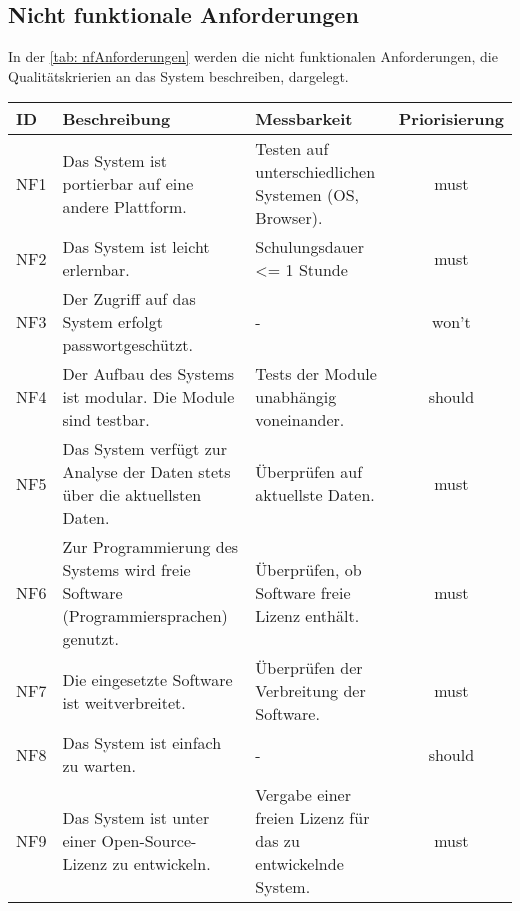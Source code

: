 \subsection{Nicht funktionale Anforderungen}
In der \autoref{tab: nfAnforderungen} werden die nicht funktionalen Anforderungen, die Qualitätskrierien an das System
beschreiben, dargelegt.
\begingroup
\setlength{\tabcolsep}{9pt} %
\renewcommand{\arraystretch}{1.0} 
\begin{table}[H]
    \centering
    \begin{adjustbox}{max width=\textwidth}
    \begin{tabular}{lp{7.0cm}p{7.0cm}c}
       \toprule
       \textbf{ID}          & \textbf{Beschreibung} & \textbf{Messbarkeit} & \textbf{Priorisierung}\\
       \midrule
        NF1                               &Das System ist portierbar auf eine andere Plattform. & Testen auf unterschiedlichen Systemen (OS, Browser). & must\\
        NF2                               &Das System ist leicht erlernbar.& Schulungsdauer <= 1 Stunde  & must\\
        NF3                               &Der Zugriff auf das System erfolgt passwortgeschützt. & -  & won't\\
        NF4                               &Der Aufbau des Systems ist modular. Die Module sind testbar. & Tests der Module unabhängig voneinander. & should\\
        NF5                               &Das System verfügt zur Analyse der Daten stets über die aktuellsten Daten. & Überprüfen auf aktuellste Daten. & must\\
        NF6                               &Zur Programmierung des Systems wird freie Software (Programmiersprachen) genutzt. & Überprüfen, ob Software freie Lizenz enthält.  & must\\
        NF7                               &Die eingesetzte Software ist weitverbreitet. & Überprüfen der Verbreitung der Software. & must\\
        NF8                               &Das System ist einfach zu warten. & - & should\\
        NF9                               &Das System ist unter einer Open-Source-Lizenz zu entwickeln. & Vergabe einer freien Lizenz für das zu entwickelnde System.  & must\\

\end{tabular}
\end{adjustbox}
\end{table}
